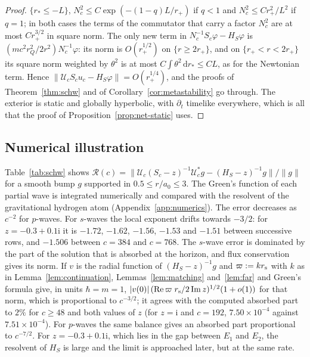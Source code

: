 \documentclass[%
 aip,
 jmp,
 amsmath,amssymb,
 reprint, onecolumn
]{revtex4-1}
\theoremstyle{definition}
\theoremstyle{remark}
\newcommand{\rmd}{\mathrm{d}}
\newcommand{\rmi}{\mathrm{i}}
\begin{document}
\begin{proof}
$\{r_*\leq-L\}$, $N_c^2\leq C\exp(-(1-q)L/r_+)$ if $q<1$ and $N_c^2\leq
Cr_+^2/L^2$ if $q=1$; in both cases the terms of the commutator that
carry a factor $N_c^2$ are at most $Cr_+^{3/2}$ in square norm. The only
new term in $N_c^{-1}S_c\varphi-H_S\varphi$ is
$(mc^2r_Q^2/2r^2)N_c^{-1}\varphi$: its norm is $O(r_+^{1/2})$ on
$\{r\geq2r_+\}$, and on $\{r_+<r<2r_+\}$ its square norm weighted by
$\theta^2$ is at most $C\int\theta^2\,\rmd r_*\leq CL$, as for the
Newtonian term. Hence $\|\mathcal{U}_cS_cu_c-H_S\varphi\|=O(r_+^{1/4})$,
and the proofs of Theorem~\ref{thm:schw} and of
Corollary~\ref{cor:metastability} go through. The exterior is static and
globally hyperbolic, with $\partial_t$ timelike everywhere, which is all
that the proof of Proposition~\ref{prop:net-static} uses.
\end{proof}

\subsection{Numerical illustration}\label{sec:schw-numerics}

Table~\ref{tab:schw} shows $\mathcal{R}(c)=\|\mathcal{U}_c(S_c-z)^{-1}
\mathcal{U}_c^*g-(H_S-z)^{-1}g\|/\|g\|$ for a smooth bump $g$ supported
in $0.5\leq r/a_0\leq3$. The Green's function of each partial wave is
integrated numerically and compared with the resolvent of the
gravitational hydrogen atom (Appendix~\ref{app:numerics}). The error
decreases as $c^{-2}$ for $p$-waves. For $s$-waves the local exponent
drifts towards $-3/2$: for $z=-0.3+0.1\rmi$ it is $-1.72$, $-1.62$,
$-1.56$, $-1.53$ and $-1.51$ between successive rows, and $-1.506$
between $c=384$ and $c=768$. The $s$-wave error is dominated by the part
of the solution that is absorbed at the horizon, and flux conservation
gives its norm. If $v$ is the radial function of $(H_S-z)^{-1}g$ and
$\varpi:=kr_{\rm s}$ with $k$ as in Lemma~\ref{lem:continuation},
Lemmas~\ref{lem:matching} and~\ref{lem:far} and Green's formula give,
in units $\hbar=m=1$,
$|v(0)|\,(\mathrm{Re}\,\varpi\;r_{\rm s}/2\,\mathrm{Im}\,z)^{1/2}(1+o(1))$
for that
norm, which is proportional to $c^{-3/2}$; it agrees with the computed
absorbed part to $2\%$ for $c\geq48$ and both values of $z$ (for $z=\rmi$
and $c=192$, $7.50\times10^{-4}$ against $7.51\times10^{-4}$). For
$p$-waves the same balance gives an absorbed part proportional to
$c^{-7/2}$. For $z=-0.3+0.1\rmi$, which lies in the gap between $E_1$ and
$E_2$, the resolvent of $H_S$ is large and the limit is approached
later, but at the same rate.
\end{document}
